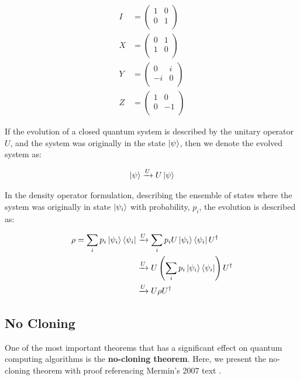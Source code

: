 \begin{align}
    I &= \begin{pmatrix}
        1 & 0 \\ 
        0 & 1 \\ 
    \end{pmatrix} \\ 
    X &= \begin{pmatrix}
        0 & 1 \\ 
        1 & 0 \\ 
    \end{pmatrix} \\ 
    Y &= \begin{pmatrix}
        0 & i \\ 
        -i & 0 \\ 
    \end{pmatrix} \\ 
    Z &= \begin{pmatrix}
        1 & 0 \\ 
        0 & -1 \\ 
    \end{pmatrix}
\end{align}

If the evolution of a closed quantum system is described by the unitary operator $U$, and the system was originally in the state $\ket{\psi}$, then we denote the evolved system as:

\begin{align}
    \ket{\psi} \xrightarrow{U} U \ket{\psi}
\end{align}

In the density operator formulation, describing the ensemble of states where the system was originally in state $\ket{\psi_i}$ with probability, $p_i$, the evolution is described as:

\begin{align}
    \rho = \sum_i p_i \ket{\psi_i}\bra{\psi_i} &\xrightarrow{U} \sum_i p_i U\ket{\psi_i}\bra{\psi_i}U^{\dagger} \\
    &\xrightarrow{U} U \left(\sum_i p_i \ket{\psi_i}\bra{\psi_i} \right)U^{\dagger} \\
    &\xrightarrow{U} U \rho U^{\dagger}
\end{align}

\subsection{No Cloning}

One of the most important theorems that has a significant effect on quantum computing algorithms is the \textbf{no-cloning theorem}. Here, we present the no-cloning theorem with proof referencing Mermin's 2007 text \cite{mermin_quantum_2007}.

